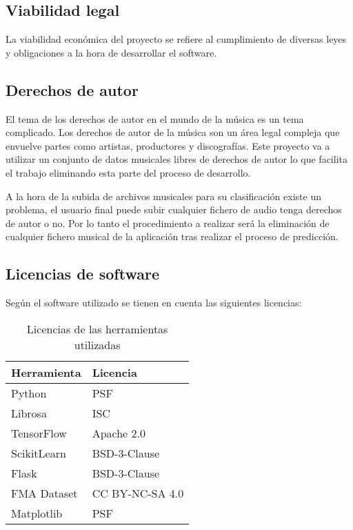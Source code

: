 \subsection{Viabilidad legal}

La viabilidad económica del proyecto se refiere al cumplimiento de diversas leyes y obligaciones a la hora de desarrollar el software.

\subsection{Derechos de autor}

El tema de los derechos de autor en el mundo de la música es un tema complicado. Los derechos de autor de la música son un área legal compleja que envuelve partes como artistas, productores y discografías. Este proyecto va a utilizar un conjunto de datos musicales libres de derechos de autor lo que facilita el trabajo eliminando esta parte del proceso de desarrollo.

A la hora de la subida de archivos musicales para su clasificación existe un problema, el usuario final puede subir cualquier fichero de audio tenga derechos de autor o no. Por lo tanto el procedimiento a realizar será la eliminación de cualquier fichero musical de la aplicación tras realizar el proceso de predicción.

\subsection{Licencias de software}

Según el software utilizado se tienen en cuenta las siguientes licencias: \cite{Creative_Commons} \cite{Open_Source_Initiative_2023}

\begin{table}[h]
\centering
\caption{Licencias de las herramientas utilizadas}
\begin{tabular}{|l|l|}
\hline
\textbf{Herramienta} & \textbf{Licencia} \\
\hline
Python \cite{3.10_Documentation} & PSF \\
Librosa \cite{librosa} & ISC \\
TensorFlow \cite{TensorFlow} & Apache 2.0 \\
ScikitLearn \cite{scikit} & BSD-3-Clause \\
Flask \cite{Flask} & BSD-3-Clause \\
FMA Dataset \cite{fma_dataset} & CC BY-NC-SA 4.0 \\
Matplotlib \cite{matplotlib} & PSF \\
\hline
\end{tabular}
\end{table}


